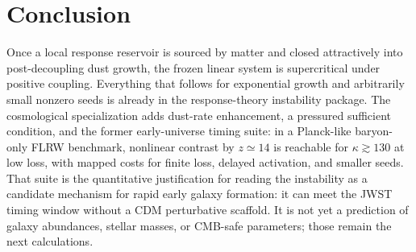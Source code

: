\documentclass[11pt]{article}
\theoremstyle{definition}
\theoremstyle{remark}
\begin{document}
\section{Conclusion}
\label{sec:conclusion}
Once a local response reservoir is sourced by matter and closed attractively into post-decoupling dust growth, the frozen linear system is supercritical under positive coupling.
Everything that follows for exponential growth and arbitrarily small nonzero seeds is already in the response-theory instability package.
The cosmological specialization adds dust-rate enhancement, a pressured sufficient condition, and the former early-universe timing suite: in a Planck-like baryon-only FLRW benchmark, nonlinear contrast by $z\simeq14$ is reachable for $\kappa\gtrsim130$ at low loss, with mapped costs for finite loss, delayed activation, and smaller seeds.
That suite is the quantitative justification for reading the instability as a candidate mechanism for rapid early galaxy formation: it can meet the JWST timing window without a CDM perturbative scaffold.
It is not yet a prediction of galaxy abundances, stellar masses, or CMB-safe parameters; those remain the next calculations.



\end{document}
